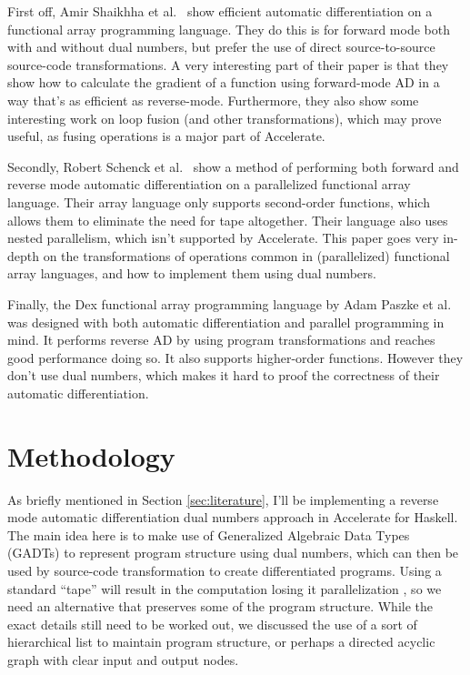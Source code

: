 \documentclass{article}
\begin{document}
                First off, Amir Shaikhha et al.\ \cite{shaikhha2019efficient} show efficient automatic differentiation on a functional array programming language.
                They do this is for forward mode both with and without dual numbers, but prefer the use of direct source-to-source source-code transformations.
                A very interesting part of their paper is that they show how to calculate the gradient of a function using forward-mode AD in a way that's as efficient as reverse-mode.
                Furthermore, they also show some interesting work on loop fusion (and other transformations), which may prove useful, as fusing operations is a major part of Accelerate.

                Secondly, Robert Schenck et al.\ \cite{schenck2022ad} show a method of performing both forward and reverse mode automatic differentiation on a parallelized functional array language.
                Their array language only supports second-order functions, which allows them to eliminate the need for tape altogether.
                Their language also uses nested parallelism, which isn't supported by Accelerate.
                This paper goes very in-depth on the transformations of operations common in (parallelized) functional array languages, and how to implement them using dual numbers.

                Finally, the Dex functional array programming language by Adam Paszke et al.\ \cite{paszke2021getting} was designed with both automatic differentiation and parallel programming in mind.
                It performs reverse AD by using program transformations and reaches good performance doing so.
                It also supports higher-order functions.
                However they don't use dual numbers, which makes it hard to proof the correctness of their automatic differentiation.    

    \section{Methodology} \label{sec:methods}
        As briefly mentioned in Section \ref{sec:literature}, I'll be implementing a reverse mode automatic differentiation dual numbers approach in Accelerate for Haskell.
        The main idea here is to make use of Generalized Algebraic Data Types (GADTs) to represent program structure using dual numbers, which can then be used by source-code transformation to create differentiated programs.
        Using a standard ``tape'' will result in the computation losing it parallelization \cite{smeding2022efficient}, so we need an alternative that preserves some of the program structure.
        While the exact details still need to be worked out, we discussed the use of a sort of hierarchical list to maintain program structure, or perhaps a directed acyclic graph with clear input and output nodes.
\end{document}
